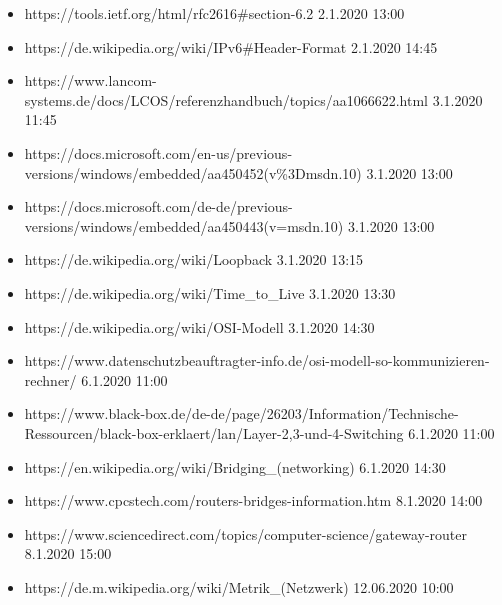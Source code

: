\begin{itemize}
    \item https://tools.ietf.org/html/rfc2616\#section-6.2  2.1.2020 13:00 
    \item https://de.wikipedia.org/wiki/IPv6\#Header-Format 2.1.2020 14:45
    \item https://www.lancom-systems.de/docs/LCOS/referenzhandbuch/topics/aa1066622.html 3.1.2020 11:45
    \item https://docs.microsoft.com/en-us/previous-versions/windows/embedded/aa450452(v\%3Dmsdn.10) 3.1.2020 13:00
    \item https://docs.microsoft.com/de-de/previous-versions/windows/embedded/aa450443(v=msdn.10) 3.1.2020 13:00
    \item https://de.wikipedia.org/wiki/Loopback 3.1.2020 13:15
    \item https://de.wikipedia.org/wiki/Time\_to\_Live 3.1.2020 13:30
    \item https://de.wikipedia.org/wiki/OSI-Modell 3.1.2020 14:30
    \item https://www.datenschutzbeauftragter-info.de/osi-modell-so-kommunizieren-rechner/ 6.1.2020 11:00
    \item https://www.black-box.de/de-de/page/26203/Information/Technische-Ressourcen/black-box-erklaert/lan/Layer-2,3-und-4-Switching 6.1.2020 11:00
    \item https://en.wikipedia.org/wiki/Bridging\_(networking) 6.1.2020 14:30
    \item https://www.cpcstech.com/routers-bridges-information.htm 8.1.2020 14:00
    \item https://www.sciencedirect.com/topics/computer-science/gateway-router 8.1.2020 15:00
    \item https://de.m.wikipedia.org/wiki/Metrik\_(Netzwerk) 12.06.2020 10:00
\end{itemize}